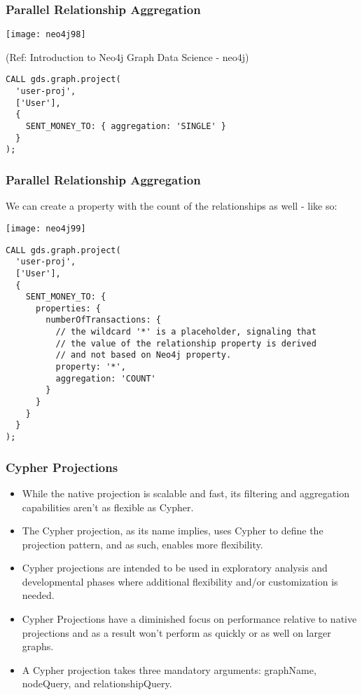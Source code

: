 \begin{frame}[fragile]\frametitle{Parallel Relationship Aggregation}

\begin{center}
\texttt{[image: neo4j98]}
\end{center}	

{\tiny (Ref: Introduction to Neo4j Graph Data Science - neo4j)}

\begin{lstlisting}
CALL gds.graph.project(
  'user-proj',
  ['User'],
  {
    SENT_MONEY_TO: { aggregation: 'SINGLE' }
  }
);
\end{lstlisting}
\end{frame}

\begin{frame}[fragile]\frametitle{Parallel Relationship Aggregation}

We can create a property with the count of the relationships as well - like so:

\begin{center}
\texttt{[image: neo4j99]}
\end{center}	

\begin{lstlisting}
CALL gds.graph.project(
  'user-proj',
  ['User'],
  {
    SENT_MONEY_TO: {
      properties: {
        numberOfTransactions: {
          // the wildcard '*' is a placeholder, signaling that
          // the value of the relationship property is derived
          // and not based on Neo4j property.
          property: '*',
          aggregation: 'COUNT'
        }
      }
    }
  }
);
\end{lstlisting}
\end{frame}

\begin{frame}[fragile]\frametitle{Cypher Projections}

\begin{itemize}
\item While the native projection is scalable and fast, its filtering and aggregation capabilities aren’t as flexible as Cypher. \item The Cypher projection, as its name implies, uses Cypher to define the projection pattern, and as such, enables more flexibility.
\item Cypher projections are intended to be used in exploratory analysis and developmental phases where additional flexibility and/or customization is needed.
\item Cypher Projections have a diminished focus on performance relative to native projections and as a result won’t perform as quickly or as well on larger graphs.
\item A Cypher projection takes three mandatory arguments: graphName, nodeQuery, and relationshipQuery. 
\end{itemize}


\end{frame}

